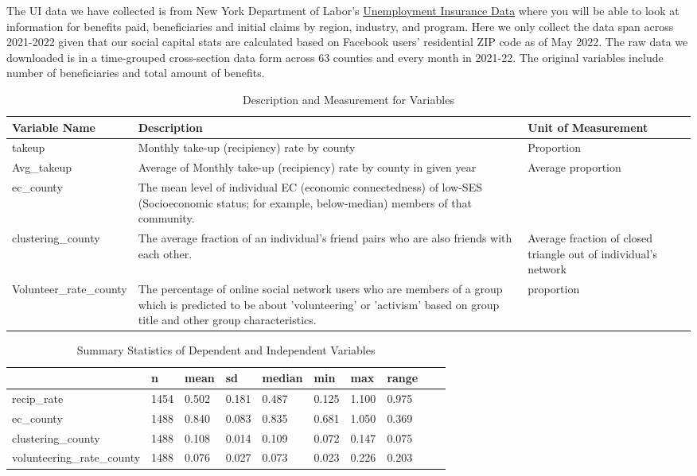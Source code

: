 \documentclass{article}
\begin{document}
The UI data we have collected is from New York Department of Labor's \href{https://dol.ny.gov/local-area-unemployment-statistics}{Unemployment Insurance Data} where you will be able to look at information for benefits paid, beneficiaries and initial claims by region, industry, and program. Here we only collect the data span across 2021-2022 given that our social capital stats are calculated based on Facebook users' residential ZIP code as of May 2022. The raw data we downloaded is in a time-grouped cross-section data form across 63 counties and every month in 2021-22. The original variables include number of beneficiaries and total amount of benefits.


\begin{table}[h]
\centering
\begin{tabular}{|p{3.2cm}|p{8cm}|p{4cm}|}
\hline
\textbf{Variable Name} & \textbf{Description} & \textbf{ Unit of Measurement} \\ \hline
takeup & Monthly take-up (recipiency) rate by county & Proportion  \\ \hline
Avg\_takeup & Average of Monthly take-up (recipiency) rate by county in given year & Average proportion \\ \hline
ec\_county & The mean level of individual EC (economic connectedness) of low-SES (Socioeconomic status; for example, below-median) members of that community. &  \\ \hline
clustering\_county & The average fraction of an individual's friend pairs who are also friends with each other. & Average fraction of closed triangle out of individual's network \\ \hline
Volunteer\_rate\_county & The percentage of online social network users who are members of a group which is predicted to be about 'volunteering' or 'activism' based on group title and other group characteristics. & proportion \\ \hline
\end{tabular}
\caption{Description and Measurement for Variables}
\label{variablel descr}
\end{table}


\begin{table}


\centering
\begin{tabular}[h]{|m|m|m|m|m|m|m|m|m|m|}
\hline
  & n & mean & sd & median & min & max & range\\
\hline
recip\_rate & 1454 & 0.502 & 0.181 & 0.487 & 0.125 & 1.100 & 0.975\\
\hline
ec\_county & 1488 & 0.840 & 0.083 & 0.835 & 0.681 & 1.050 & 0.369\\
\hline
clustering\_county & 1488 & 0.108 & 0.014 & 0.109 & 0.072 & 0.147 & 0.075\\
\hline
volunteering\_rate\_county & 1488 & 0.076 & 0.027 & 0.073 & 0.023 & 0.226 & 0.203\\
\hline
\end{tabular}
\caption{Summary Statistics of Dependent and Independent Variables}
\end{table}
\end{document}
